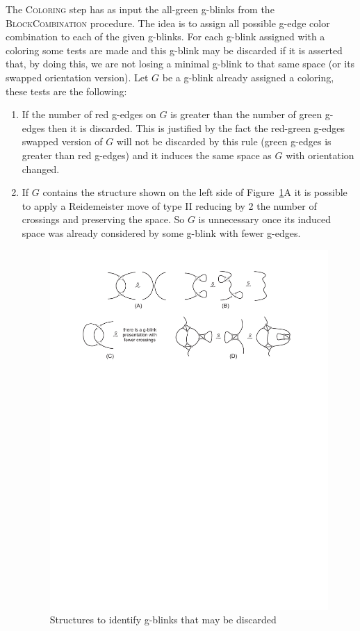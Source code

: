 The \textsc{Coloring} step has as input the  all-green
g-blinks from the \textsc{BlockCombination} procedure.
The idea is to assign all possible g-edge color combination
to each of the given g-blinks. For each g-blink assigned
with a coloring some tests are made and this g-blink may
be discarded if it is asserted that, by doing this, we are
not losing a minimal g-blink to that same space (or its swapped
orientation version). Let $G$ be a g-blink already assigned
a coloring, these tests are the following:
\begin{enumerate}
\item If the number of red g-edges on $G$ is greater than the
number of green g-edges then it is discarded. This is
justified by the fact the red-green g-edges swapped version of $G$
will not be discarded by this rule (green g-edges is greater than
red g-edges) and it induces the same space as $G$ with orientation
changed.

\item If $G$ contains the structure shown
on the left side of Figure~\ref{fig:unecessaryGBlinkStructure}A it
is possible to apply a Reidemeister move of type II reducing by 2
the number of crossings and preserving the space. So $G$ is
unnecessary once its induced space was already considered by some
g-blink with fewer g-edges.

\begin{figure}[htp]
   \begin{center}
      \leavevmode
      \includegraphics[width=12cm]{fig/unnecessaryGBlinkStructure.pdf}
   \end{center}
   \vspace{-0.7cm}
   \caption{ Structures to identify g-blinks that may be discarded}
   \label{fig:unecessaryGBlinkStructure}
\end{figure}


\end{enumerate}
